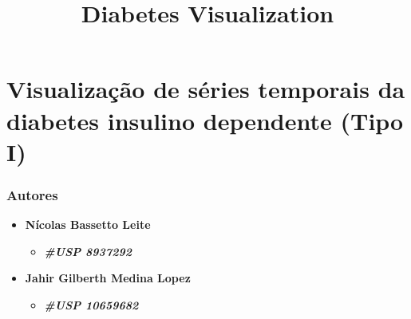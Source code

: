 \documentclass[11pt]{article}
\title{Diabetes Visualization}
\providecommand{\tightlist}{%
      \setlength{\itemsep}{0pt}\setlength{\parskip}{0pt}}
\begin{document}
    
    
    \maketitle
    
    

    
    \section{Visualização de séries temporais da diabetes insulino
dependente (Tipo
I)}\label{visualizauxe7uxe3o-de-suxe9ries-temporais-da-diabetes-insulino-dependente-tipo-i}

\subsubsection{Autores}\label{autores}

\begin{itemize}
\tightlist
\item
  \textbf{Nícolas Bassetto Leite}

  \begin{itemize}
  \tightlist
  \item
    \textbf{\emph{\#USP 8937292}}
  \end{itemize}
\item
  \textbf{Jahir Gilberth Medina Lopez}

  \begin{itemize}
  \tightlist
  \item
    \textbf{\emph{\#USP 10659682}}
  \end{itemize}
\end{itemize}
\end{document}
